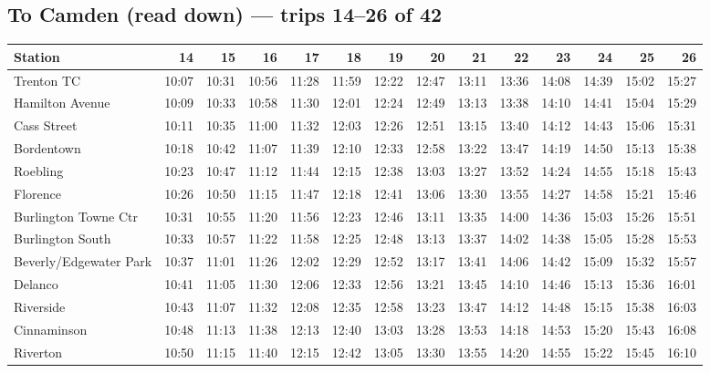 \subsection*{To Camden (read down) --- trips 14--26 of 42}
\begin{center}\footnotesize\setlength{\tabcolsep}{3pt}\begin{tabular}{@{}lrrrrrrrrrrrrr@{}}\toprule
Station & 14 & 15 & 16 & 17 & 18 & 19 & 20 & 21 & 22 & 23 & 24 & 25 & 26 \\\midrule
Trenton TC & 10:07 & 10:31 & 10:56 & 11:28 & 11:59 & 12:22 & 12:47 & 13:11 & 13:36 & 14:08 & 14:39 & 15:02 & 15:27 \\
Hamilton Avenue & 10:09 & 10:33 & 10:58 & 11:30 & 12:01 & 12:24 & 12:49 & 13:13 & 13:38 & 14:10 & 14:41 & 15:04 & 15:29 \\
Cass Street & 10:11 & 10:35 & 11:00 & 11:32 & 12:03 & 12:26 & 12:51 & 13:15 & 13:40 & 14:12 & 14:43 & 15:06 & 15:31 \\
Bordentown & 10:18 & 10:42 & 11:07 & 11:39 & 12:10 & 12:33 & 12:58 & 13:22 & 13:47 & 14:19 & 14:50 & 15:13 & 15:38 \\
Roebling & 10:23 & 10:47 & 11:12 & 11:44 & 12:15 & 12:38 & 13:03 & 13:27 & 13:52 & 14:24 & 14:55 & 15:18 & 15:43 \\
Florence & 10:26 & 10:50 & 11:15 & 11:47 & 12:18 & 12:41 & 13:06 & 13:30 & 13:55 & 14:27 & 14:58 & 15:21 & 15:46 \\
Burlington Towne Ctr & 10:31 & 10:55 & 11:20 & 11:56 & 12:23 & 12:46 & 13:11 & 13:35 & 14:00 & 14:36 & 15:03 & 15:26 & 15:51 \\
Burlington South & 10:33 & 10:57 & 11:22 & 11:58 & 12:25 & 12:48 & 13:13 & 13:37 & 14:02 & 14:38 & 15:05 & 15:28 & 15:53 \\
Beverly/Edgewater Park & 10:37 & 11:01 & 11:26 & 12:02 & 12:29 & 12:52 & 13:17 & 13:41 & 14:06 & 14:42 & 15:09 & 15:32 & 15:57 \\
Delanco & 10:41 & 11:05 & 11:30 & 12:06 & 12:33 & 12:56 & 13:21 & 13:45 & 14:10 & 14:46 & 15:13 & 15:36 & 16:01 \\
Riverside & 10:43 & 11:07 & 11:32 & 12:08 & 12:35 & 12:58 & 13:23 & 13:47 & 14:12 & 14:48 & 15:15 & 15:38 & 16:03 \\
Cinnaminson & 10:48 & 11:13 & 11:38 & 12:13 & 12:40 & 13:03 & 13:28 & 13:53 & 14:18 & 14:53 & 15:20 & 15:43 & 16:08 \\
Riverton & 10:50 & 11:15 & 11:40 & 12:15 & 12:42 & 13:05 & 13:30 & 13:55 & 14:20 & 14:55 & 15:22 & 15:45 & 16:10 \\

\end{tabular}
\end{center}
